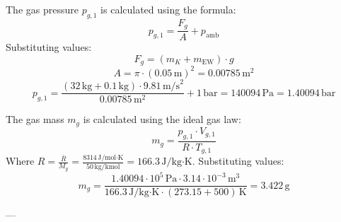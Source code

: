 The gas pressure \( p_{g,1} \) is calculated using the formula:  
\[
p_{g,1} = \frac{F_g}{A} + p_{\text{amb}}
\]  
Substituting values:  
\[
F_g = (m_K + m_{\text{EW}}) \cdot g
\]  
\[
A = \pi \cdot (0.05 \, \text{m})^2 = 0.00785 \, \text{m}^2
\]  
\[
p_{g,1} = \frac{(32 \, \text{kg} + 0.1 \, \text{kg}) \cdot 9.81 \, \text{m/s}^2}{0.00785 \, \text{m}^2} + 1 \, \text{bar} = 140094 \, \text{Pa} = 1.40094 \, \text{bar}
\]  

The gas mass \( m_g \) is calculated using the ideal gas law:  
\[
m_g = \frac{p_{g,1} \cdot V_{g,1}}{R \cdot T_{g,1}}
\]  
Where \( R = \frac{\bar{R}}{M_g} = \frac{8314 \, \text{J/mol·K}}{50 \, \text{kg/kmol}} = 166.3 \, \text{J/kg·K} \).  
Substituting values:  
\[
m_g = \frac{1.40094 \cdot 10^5 \, \text{Pa} \cdot 3.14 \cdot 10^{-3} \, \text{m}^3}{166.3 \, \text{J/kg·K} \cdot (273.15 + 500) \, \text{K}} = 3.422 \, \text{g}
\]  

---